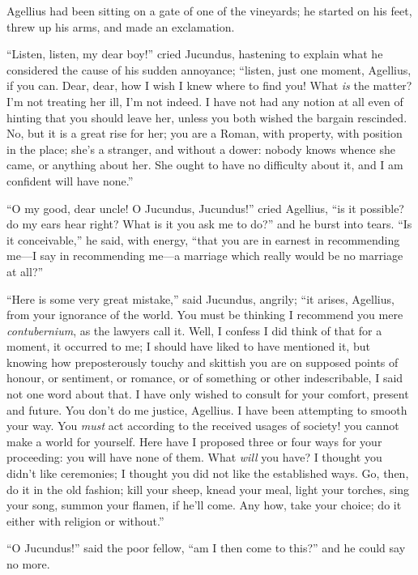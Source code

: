 Agellius had been sitting on a gate of one of the vineyards; he
started on his feet, threw up his arms, and made an exclamation.

``Listen, listen, my dear boy!'' cried Jucundus, hastening
to explain what he considered the cause of his sudden annoyance;
``listen, just one moment, Agellius, if you can. Dear, dear, how I
wish I knew where to find you! What \emph{is} the matter? I'm not
treating her ill, I'm not indeed. I have not had any notion at all
even of hinting that you should leave her, unless you both wished the
bargain rescinded. No, but it is a great rise for her; you are a
Roman, with property, with position in the place; she's a stranger,
and without a dower: nobody knows whence she came, or anything about
her. She ought to have no difficulty about it, and I am confident will
have none.''

``O my good, dear uncle! O Jucundus, Jucundus!'' cried
Agellius, ``is it possible? do my ears hear right? What is it you
ask me to do?'' and he burst into tears. ``Is it
conceivable,'' he said, with energy, ``that you are in earnest
in recommending me—I say in recommending me—a marriage which
really would be no marriage at all?''

``Here is some very great mistake,'' said Jucundus,
angrily; ``it arises, Agellius, from your ignorance of the world. You
must be thinking I recommend you mere \emph{contubernium}, as the
lawyers call it. Well, I confess I did think of that for a moment, it
occurred to me; I should have liked to have mentioned it, but knowing
how preposterously touchy and skittish you are on supposed points of
honour, or sentiment, or romance, or of something or other
indescribable, I said not one word about that. I have only wished to
consult for your comfort, present and future. You don't do me justice,
Agellius. I have been attempting to smooth your way. You \emph{must}
act according to the received usages of society! you cannot make a
world for yourself. Here have I proposed three or four ways for your
proceeding: you will have none of them. What \emph{will} you have? I
thought you didn't like ceremonies; I thought you did not like the
established ways. Go, then, do it in the old fashion; kill your sheep,
knead your meal, light your torches, sing your song, summon your
flamen, if he'll come. Any how, take your choice; do it either with
religion or without.''

``O Jucundus!'' said the poor fellow, ``am I then come
to this?'' and he could say no more.

